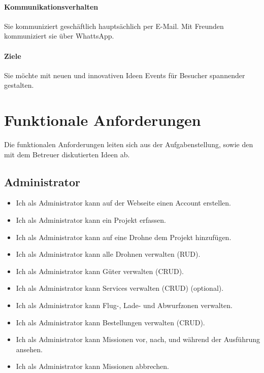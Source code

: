 \paragraph{Kommunikationsverhalten}
Sie kommuniziert geschäftlich hauptsächlich per E-Mail. Mit Freunden kommuniziert sie über WhattsApp.

\paragraph{Ziele}
Sie möchte mit neuen und innovativen Ideen Events für Besucher spannender gestalten.

\section{Funktionale Anforderungen}

Die funktionalen Anforderungen leiten sich aus der Aufgabenstellung, sowie den mit dem Betreuer diskutierten Ideen ab.

\subsection{Administrator}
\begin{itemize}
\item Ich als Administrator kann auf der Webseite einen Account erstellen.
\item Ich als Administrator kann ein Projekt erfassen.
\item Ich als Administrator kann auf eine Drohne dem Projekt hinzufügen.
\item Ich als Administrator kann alle Drohnen verwalten (RUD).
\item Ich als Administrator kann Güter verwalten (CRUD).
\item Ich als Administrator kann Services verwalten (CRUD) (optional).
\item Ich als Administrator kann Flug-, Lade- und Abwurfzonen verwalten.
\item Ich als Administrator kann Bestellungen verwalten (CRUD).
\item Ich als Administrator kann Missionen vor, nach, und während der Ausführung ansehen.
\item Ich als Administrator kann Missionen abbrechen.
\end{itemize}

